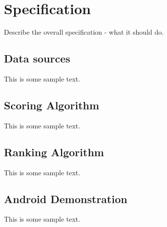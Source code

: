 \chapter{Specification}

Describe the overall specification - what it should do.

\section{Data sources}

This is some sample text.

\section{Scoring Algorithm}

This is some sample text.

\section{Ranking Algorithm}

This is some sample text.

\section{Android Demonstration}

This is some sample text.